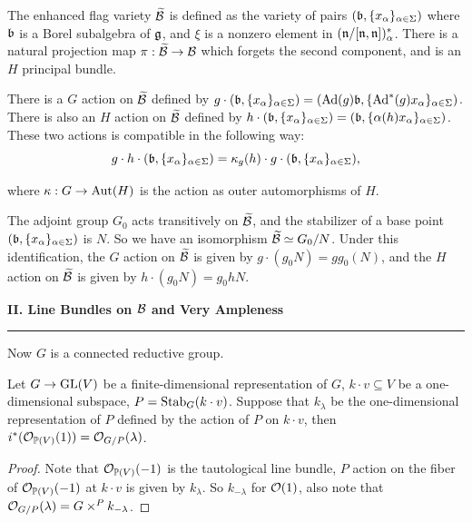 The enhanced flag variety $\widetilde{\mathcal{B}}$ is defined as the variety of pairs $(\mathfrak{b}, \{x_{\alpha}\}_{\alpha \in \Sigma})$ where $\mathfrak{b}$ is a Borel subalgebra of $\mathfrak{g}$, and $\xi$ is a nonzero element in $(\mathfrak{n}/[\mathfrak{n},\mathfrak{n}])^*_{\alpha}$. There is a natural projection map $\pi : \widetilde{\mathcal{B}} \to \mathcal{B}$ which forgets the second component, and is an $H$ principal bundle.

There is a $G$ action on $\widetilde{\mathcal{B}}$ defined by $g \cdot (\mathfrak{b}, \{x_{\alpha}\}_{\alpha \in \Sigma}) = (\operatorname{Ad}(g)\mathfrak{b}, \{\operatorname{Ad}^*(g)x_{\alpha}\}_{\alpha \in \Sigma})$. There is also an $H$ action on $\widetilde{\mathcal{B}}$ defined by $h \cdot (\mathfrak{b}, \{x_{\alpha}\}_{\alpha \in \Sigma}) = (\mathfrak{b}, \{\alpha(h)x_{\alpha}\}_{\alpha \in \Sigma})$. These two actions is compatible in the following way:
\[
  g \cdot h \cdot (\mathfrak{b}, \{x_{\alpha}\}_{\alpha \in \Sigma}) = \kappa_{g}(h) \cdot g \cdot (\mathfrak{b}, \{x_{\alpha}\}_{\alpha \in \Sigma}),
\]

where $\kappa: G \to \operatorname{Aut}(H)$ is the action as outer automorphisms of $H$.

The adjoint group $G_0$ acts transitively on $\widetilde{\mathcal{B}}$, and the stabilizer of a base point $(\mathfrak{b}, \{x_{\alpha}\}_{\alpha \in \Sigma})$ is $N$. So we have an isomorphism $\widetilde{\mathcal{B}} \simeq G_0/N$. Under this identification, the $G$ action on $\widetilde{\mathcal{B}}$ is given by $g \cdot (g_0N) = gg_0(N)$, and the $H$ action on $\widetilde{\mathcal{B}}$ is given by $h \cdot (g_0N) = g_0 hN$.

\vspace{5mm}



\noindent\textbf{\large II. Line Bundles on $\mathcal{B}$ and Very Ampleness}
\vspace{2mm}
\hrule
\vspace{3mm}


Now $G$ is a connected reductive group.

\begin{lem}
  Let $G \to \operatorname{GL}(V)$ be a finite-dimensional representation of $G$, $k \cdot v \subseteq V$ be a one-dimensional subspace, $P = \operatorname{Stab}_G(k \cdot v)$. Suppose that $k_{\lambda}$ be the one-dimensional representation of $P$ defined by the action of $P$ on $k \cdot v$, then $i^*(\mathcal{O}_{\mathbb{P}(V)}(1)) = \mathcal{O}_{G/P}(\lambda)$.
\end{lem}

\begin{proof}
  Note that $\mathcal{O}_{\mathbb{P}(V)}(-1)$ is the tautological line bundle, $P$ action on the fiber of $\mathcal{O}_{\mathbb{P}(V)}(-1)$ at $k \cdot v$ is given by $k_{\lambda}$. So $k_{-\lambda}$ for $\mathcal{O}(1)$, also note that $\mathcal{O}_{G/P}(\lambda) = G \times^{P} k_{-\lambda}$.
\end{proof}

